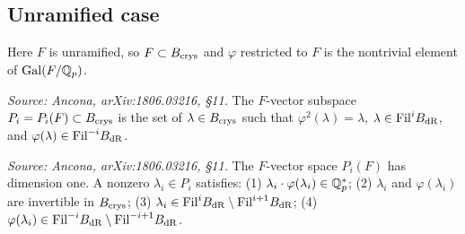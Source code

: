 \subsection*{Unramified case}

Here \(F\) is unramified, so \(F \subset B_{\mathrm{crys}}\) and \(\varphi\) restricted to
\(F\) is the nontrivial element of \(\mathrm{Gal}(F/\mathbb{Q}_p)\).

\begin{definition}
  \label{def:periods-unram}
  \textit{Source: Ancona, arXiv:1806.03216, \S11.}
  The \(F\)-vector subspace \(P_i = P_i(F) \subset B_{\mathrm{crys}}\) is the set of
  \(\lambda \in B_{\mathrm{crys}}\) such that \(\varphi^2(\lambda) = \lambda\),
  \(\lambda \in \mathrm{Fil}^i B_{\mathrm{dR}}\), and \(\varphi(\lambda) \in \mathrm{Fil}^{-i} B_{\mathrm{dR}}\).
\end{definition}

\begin{proposition}
  \label{prop:periods-unram-dim}
  \textit{Source: Ancona, arXiv:1806.03216, \S11.}
  The \(F\)-vector space \(P_i(F)\) has dimension one. A nonzero
  \(\lambda_i \in P_i\) satisfies:
  (1) \(\lambda_i \cdot \varphi(\lambda_i) \in \mathbb{Q}_p^*\);
  (2) \(\lambda_i\) and \(\varphi(\lambda_i)\) are invertible in \(B_{\mathrm{crys}}\);
  (3) \(\lambda_i \in \mathrm{Fil}^i B_{\mathrm{dR}} \setminus \mathrm{Fil}^{i+1} B_{\mathrm{dR}}\);
  (4) \(\varphi(\lambda_i) \in \mathrm{Fil}^{-i} B_{\mathrm{dR}} \setminus \mathrm{Fil}^{-i+1} B_{\mathrm{dR}}\).
\end{proposition}


